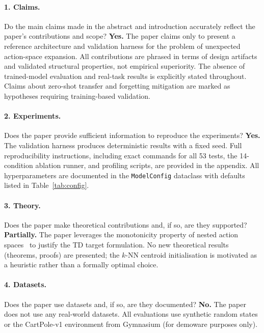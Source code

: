 \documentclass{article}
\begin{document}
\paragraph{1. Claims.}
Do the main claims made in the abstract and introduction accurately reflect the
paper's contributions and scope?
\textbf{Yes.} The paper claims only to present a reference architecture and
validation harness for the problem of unexpected action-space expansion. All
contributions are phrased in terms of design artifacts and validated structural
properties, not empirical superiority. The absence of trained-model evaluation
and real-task results is explicitly stated throughout. Claims about zero-shot
transfer and forgetting mitigation are marked as hypotheses requiring
training-based validation.

\paragraph{2. Experiments.}
Does the paper provide sufficient information to reproduce the experiments?
\textbf{Yes.} The validation harness produces deterministic results with a
fixed seed. Full reproducibility instructions, including exact commands for all
53 tests, the 14-condition ablation runner, and profiling scripts, are provided
in the appendix. All hyperparameters are documented in the
\texttt{ModelConfig} dataclass with defaults listed in Table~\ref{tab:config}.

\paragraph{3. Theory.}
Does the paper make theoretical contributions and, if so, are they supported?
\textbf{Partially.} The paper leverages the monotonicity property of nested
action spaces~\cite{farquhar2020growing} to justify the TD target formulation.
No new theoretical results (theorems, proofs) are presented; the $k$-NN
centroid initialisation is motivated as a heuristic rather than a formally
optimal choice.

\paragraph{4. Datasets.}
Does the paper use datasets and, if so, are they documented?
\textbf{No.} The paper does not use any real-world datasets. All evaluations
use synthetic random states or the CartPole-v1 environment from Gymnasium (for
demoware purposes only).
\end{document}
